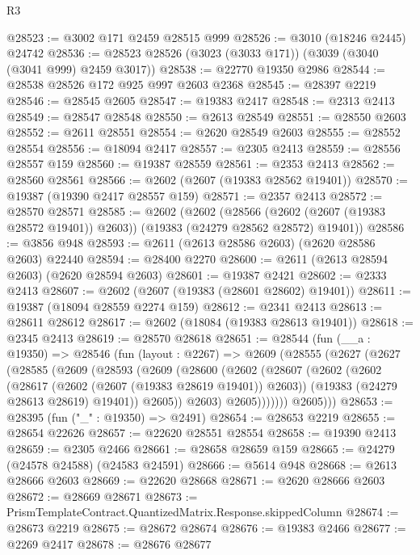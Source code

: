 \begin{lexlean}{R3}
\begin{coremodule}
@28523 := @3002 @171 @2459 @28515 @999
@28526 := @3010 (@18246 @2445) @24742
@28536 := @28523 @28526 (@3023 (@3033 @171)) (@3039 (@3040 (@3041 @999) @2459 @3017))
@28538 := @22770 @19350 @2986
@28544 := @28538 @28526 @172 @925 @997 @2603 @2368
@28545 := @28397 @2219
@28546 := @28545 @2605
@28547 := @19383 @2417
@28548 := @2313 @2413
@28549 := @28547 @28548
@28550 := @2613 @28549
@28551 := @28550 @2603
@28552 := @2611 @28551
@28554 := @2620 @28549 @2603
@28555 := @28552 @28554
@28556 := @18094 @2417
@28557 := @2305 @2413
@28559 := @28556 @28557 @159
@28560 := @19387 @28559
@28561 := @2353 @2413
@28562 := @28560 @28561
@28566 := @2602 (@2607 (@19383 @28562 @19401))
@28570 := @19387 (@19390 @2417 @28557 @159)
@28571 := @2357 @2413
@28572 := @28570 @28571
@28585 := @2602
    (@2602
      (@28566 (@2602 (@2607 (@19383 @28572 @19401)) @2603))
      (@19383 (@24279 @28562 @28572) @19401))
@28586 := @3856 @948
@28593 := @2611 (@2613 @28586 @2603) (@2620 @28586 @2603) @22440
@28594 := @28400 @2270
@28600 := @2611 (@2613 @28594 @2603) (@2620 @28594 @2603)
@28601 := @19387 @2421
@28602 := @2333 @2413
@28607 := @2602 (@2607 (@19383 (@28601 @28602) @19401))
@28611 := @19387 (@18094 @28559 @2274 @159)
@28612 := @2341 @2413
@28613 := @28611 @28612
@28617 := @2602 (@18084 (@19383 @28613 @19401))
@28618 := @2345 @2413
@28619 := @28570 @28618
@28651 := @28544
    (fun (__a : @19350) =>
    @28546
      (fun (layout : @2267) =>
      @2609
        (@28555
          (@2627
            (@2627
              (@28585
                (@2609
                  (@28593
                    (@2609
                      (@28600
                        (@2602
                          (@28607
                            (@2602
                              (@2602
                                (@28617 (@2602 (@2607 (@19383 @28619 @19401)) @2603))
                                (@19383 (@24279 @28613 @28619) @19401))
                              @2605))
                          @2603)
                        @2605)))))))
          @2605)))
@28653 := @28395 (fun ("_" : @19350) => @2491)
@28654 := @28653 @2219
@28655 := @28654 @22626
@28657 := @22620 @28551 @28554
@28658 := @19390 @2413
@28659 := @2305 @2466
@28661 := @28658 @28659 @159
@28665 := @24279 (@24578 @24588) (@24583 @24591)
@28666 := @5614 @948
@28668 := @2613 @28666 @2603
@28669 := @22620 @28668
@28671 := @2620 @28666 @2603
@28672 := @28669 @28671
@28673 := PrismTemplateContract.QuantizedMatrix.Response.skippedColumn
@28674 := @28673 @2219
@28675 := @28672 @28674
@28676 := @19383 @2466
@28677 := @2269 @2417
@28678 := @28676 @28677

\end{coremodule}
\end{lexlean}
